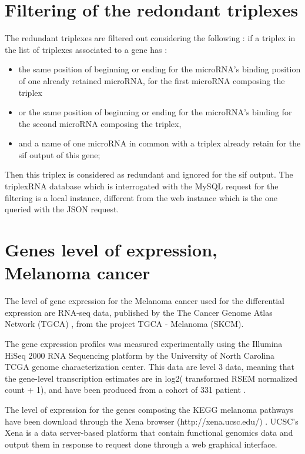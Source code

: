 \documentclass[a4paper,12pt]{report}
\begin{document}
\section{Filtering of the redondant triplexes}

The redundant triplexes are filtered out considering the following : if a triplex in the list of triplexes associated to a gene has : 
\begin{itemize}
	\item the same position of beginning or ending for the microRNA's binding position of one already retained microRNA, for the first microRNA composing the triplex
	\item or the same position of beginning or ending for the microRNA's binding for the second microRNA composing the triplex, 
	\item and a name of one microRNA in common with a triplex already retain for the sif output of this gene;
\end{itemize}

Then this triplex is considered as redundant and ignored for the sif output.
The triplexRNA database which is interrogated with the MySQL request for the filtering is a local instance, different from the web instance which is the one queried with the JSON request. 

\section{Genes level of expression, Melanoma cancer}

The level of gene expression for the Melanoma cancer used for the differential expression are RNA-seq data, published by the The Cancer Genome Atlas Network (TGCA) \cite{TGCA}, from the project TGCA - Melanoma (SKCM).

The gene expression profiles was measured experimentally using the Illumina HiSeq 2000 RNA Sequencing platform by the University of North Carolina TCGA genome characterization center. This data are level 3 data, meaning that the gene-level transcription estimates are in log2( transformed RSEM normalized count + 1), and have been produced from a cohort of 331 patient \cite{TGCA}.

The level of expression for the genes composing the KEGG melanoma pathways have been download through the Xena browser (http://xena.ucsc.edu/) \cite{Xena}. UCSC's Xena is a data server-based platform that contain functional genomics data and output them in response to request done through a web graphical interface. 
\end{document}
